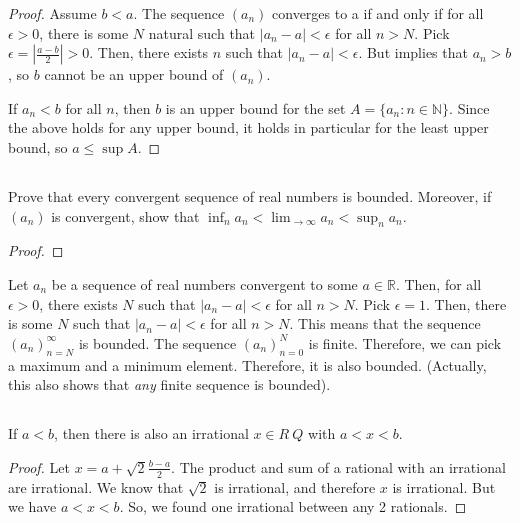 \begin{proof}
Assume $b < a$. The sequence $(a_n)$ converges to a if and only if for all $\epsilon > 0$, there is some $N$ natural such that $|a_n - a| < \epsilon$ for all $n > N$. Pick $\epsilon = |\frac{a-b}{2}| > 0$. Then, there exists $n$ such that $|a_n - a| < \epsilon$. But implies that $a_n > b$, so $b$ cannot be an upper bound of $(a_n)$.

If $a_n < b$ for all $n$, then $b$ is an upper bound for the set $A=\{a_n: n \in \mathbb{N}\}$. Since the above holds for any upper bound, it holds in particular for the least upper bound, so $a \leq \sup{A}$. 
\end{proof}

\subsection{}  Prove that every convergent sequence of real numbers is bounded. Moreover, if $(a_n)$ is convergent, show that $\inf_n a_n < \lim_{\rightarrow\infty} a_n < \sup_n a_n$.

\begin{proof}

\end{proof}
Let $a_n$ be a sequence of real numbers convergent to some $a \in \mathbb{R}$. Then, for all $\epsilon > 0$, there exists $N$ such that $|a_n - a| < \epsilon$ for all $n > N$. Pick $\epsilon = 1$. Then, there is some $N$ such that $|a_n - a| < \epsilon$ for all $n > N$. This means that the sequence $(a_n)_{n=N}^{\infty}$ is bounded.
The sequence $(a_n)_{n=0}^N$ is finite. Therefore, we can pick a maximum and a minimum element. Therefore, it is also bounded. (Actually, this also shows that \textit{any} finite sequence is bounded).


\subsection{} If $a < b$, then there is also an irrational $x \in R \ Q$ with $a < x < b$.

\begin{proof}
Let $x = a + \sqrt{2}\frac{b-a}{2}$. The product and sum of a rational with an irrational are irrational. We know that $\sqrt{2}$ is irrational, and therefore $x$ is irrational. But we have $a < x < b$. So, we found one irrational between any 2 rationals.
\end{proof}


